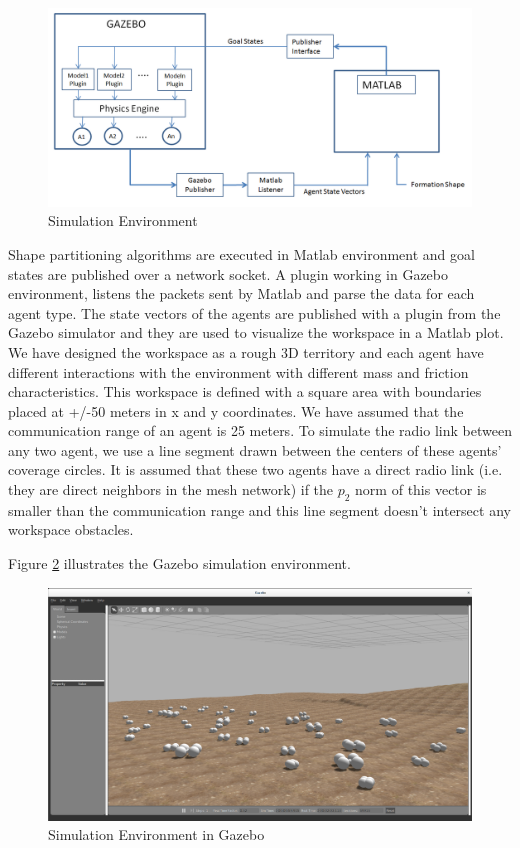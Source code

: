 \begin{figure}[H]
\caption{Simulation Environment} \label{simulation_env_ref}
\centering
\includegraphics[scale = 0.45]{environment}
\end{figure}    

 
Shape partitioning algorithms are executed in Matlab environment and goal states are published over a network socket. A plugin working in Gazebo environment, listens the packets sent by Matlab and parse the data for each agent type. The state vectors of the agents are published with a plugin from the Gazebo simulator and they are used to visualize the workspace in a Matlab plot. We have designed the workspace as a rough 3D territory and each agent have different interactions with the environment with different mass and friction characteristics. This workspace is defined with a square area with boundaries placed at +/-50 meters in x and y coordinates. We have assumed that the communication range of an agent is 25 meters. To simulate the radio link between any two agent, we use a line segment drawn between the centers of these agents' coverage circles. It is assumed that these two agents have a direct radio link (i.e. they are direct neighbors in the mesh network) if the $p_2$ norm of this vector is smaller than the communication range and this line segment doesn't intersect any workspace obstacles.

Figure \ref{Gazebo} illustrates the Gazebo simulation environment. 

\begin{figure}[H]
\caption{Simulation Environment in Gazebo} \label{Gazebo}
\centerline{\includegraphics[scale = 0.20]{gazebo_env}}
\end{figure} 

